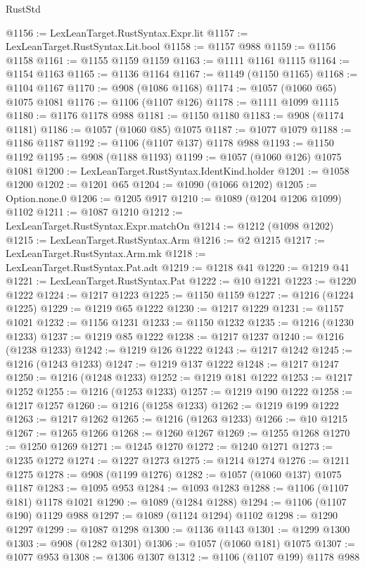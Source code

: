 \begin{lexlean}{RustStd}
\begin{coremodule}
@1156 := LexLeanTarget.RustSyntax.Expr.lit
@1157 := LexLeanTarget.RustSyntax.Lit.bool
@1158 := @1157 @988
@1159 := @1156 @1158
@1161 := @1155 @1159 @1159
@1163 := @1111 @1161 @1115
@1164 := @1154 @1163
@1165 := @1136 @1164
@1167 := @1149 (@1150 @1165)
@1168 := @1104 @1167
@1170 := @908 (@1086 @1168)
@1174 := @1057 (@1060 @65) @1075 @1081
@1176 := @1106 (@1107 @126)
@1178 := @1111 @1099 @1115
@1180 := @1176 @1178 @988
@1181 := @1150 @1180
@1183 := @908 (@1174 @1181)
@1186 := @1057 (@1060 @85) @1075
@1187 := @1077 @1079
@1188 := @1186 @1187
@1192 := @1106 (@1107 @137) @1178 @988
@1193 := @1150 @1192
@1195 := @908 (@1188 @1193)
@1199 := @1057 (@1060 @126) @1075 @1081
@1200 := LexLeanTarget.RustSyntax.IdentKind.holder
@1201 := @1058 @1200
@1202 := @1201 @65
@1204 := @1090 (@1066 @1202)
@1205 := Option.none.{0}
@1206 := @1205 @917
@1210 := @1089 (@1204 @1206 @1099) @1102
@1211 := @1087 @1210
@1212 := LexLeanTarget.RustSyntax.Expr.matchOn
@1214 := @1212 (@1098 @1202)
@1215 := LexLeanTarget.RustSyntax.Arm
@1216 := @2 @1215
@1217 := LexLeanTarget.RustSyntax.Arm.mk
@1218 := LexLeanTarget.RustSyntax.Pat.adt
@1219 := @1218 @41
@1220 := @1219 @41
@1221 := LexLeanTarget.RustSyntax.Pat
@1222 := @10 @1221
@1223 := @1220 @1222
@1224 := @1217 @1223
@1225 := @1150 @1159
@1227 := @1216 (@1224 @1225)
@1229 := @1219 @65 @1222
@1230 := @1217 @1229
@1231 := @1157 @1021
@1232 := @1156 @1231
@1233 := @1150 @1232
@1235 := @1216 (@1230 @1233)
@1237 := @1219 @85 @1222
@1238 := @1217 @1237
@1240 := @1216 (@1238 @1233)
@1242 := @1219 @126 @1222
@1243 := @1217 @1242
@1245 := @1216 (@1243 @1233)
@1247 := @1219 @137 @1222
@1248 := @1217 @1247
@1250 := @1216 (@1248 @1233)
@1252 := @1219 @181 @1222
@1253 := @1217 @1252
@1255 := @1216 (@1253 @1233)
@1257 := @1219 @190 @1222
@1258 := @1217 @1257
@1260 := @1216 (@1258 @1233)
@1262 := @1219 @199 @1222
@1263 := @1217 @1262
@1265 := @1216 (@1263 @1233)
@1266 := @10 @1215
@1267 := @1265 @1266
@1268 := @1260 @1267
@1269 := @1255 @1268
@1270 := @1250 @1269
@1271 := @1245 @1270
@1272 := @1240 @1271
@1273 := @1235 @1272
@1274 := @1227 @1273
@1275 := @1214 @1274
@1276 := @1211 @1275
@1278 := @908 (@1199 @1276)
@1282 := @1057 (@1060 @137) @1075 @1187
@1283 := @1095 @953
@1284 := @1093 @1283
@1288 := @1106 (@1107 @181) @1178 @1021
@1290 := @1089 (@1284 @1288)
@1294 := @1106 (@1107 @190) @1129 @988
@1297 := @1089 (@1124 @1294) @1102
@1298 := @1290 @1297
@1299 := @1087 @1298
@1300 := @1136 @1143
@1301 := @1299 @1300
@1303 := @908 (@1282 @1301)
@1306 := @1057 (@1060 @181) @1075
@1307 := @1077 @953
@1308 := @1306 @1307
@1312 := @1106 (@1107 @199) @1178 @988

\end{coremodule}
\end{lexlean}
